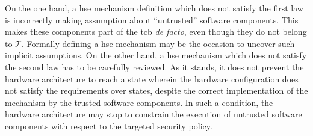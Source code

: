 On the one hand, a \ac{hse} mechanism definition which does not satisfy the
first law is incorrectly making assumption about ``untrusted'' software
components.
%
This makes these components part of the \ac{tcb} \emph{de facto}, even though
they do not belong to $\mathcal{T}$.
%
Formally defining a \ac{hse} mechanism may be the occasion to uncover such
implicit assumptions.
%
On the other hand, a \ac{hse} mechanism which does not satisfy the second law
has to be carefully reviewed.
%
As it stands, it does not prevent the hardware architecture to reach a state
wherein the hardware configuration does not satisfy the requirements over
states, despite the correct implementation of the mechanism by the trusted
software components.
%
In such a condition, the hardware architecture may stop to constrain the
execution of untrusted software components with respect to the targeted security
policy.

